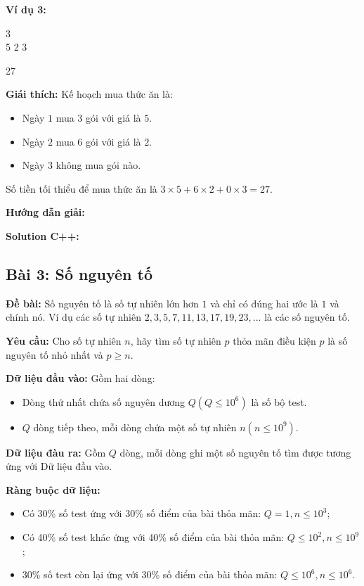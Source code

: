 \documentclass[12pt]{scrartcl}  %
\begin{document}
\textbf{Ví dụ 3:}
\begin{tcolorbox}[colback=gray!5!white, colframe=blue!50!black, title=Input]
3\\
5 2 3
\end{tcolorbox}
\begin{tcolorbox}[colback=gray!5!white, colframe=green!50!black, title=Output]
27
\end{tcolorbox}

\textbf{Giái thích:}
Kế hoạch mua thức ăn là:
\begin{itemize}
    \item Ngày $1$ mua $3$ gói với giá là $5$.
    \item Ngày $2$ mua $6$ gói với giá là $2$.
    \item Ngày $3$ không mua gói nào.
\end{itemize}
Số tiền tối thiểu để mua thức ăn là $3 \times 5 + 6 \times 2 + 0 \times 3 = 27$.

\textbf{Hướng dẫn giải:}

\textbf{Solution C++:}

\subsection{Bài 3: Số nguyên tố}
\textbf{Đề bài:}
Số nguyên tố là số tự nhiên lớn hơn $1$ và chỉ có đúng hai ước là $1$ và chính nó. Ví dụ các số tự nhiên $2, 3, 5, 7, 11, 13, 17, 19, 23, ...$ là các số nguyên tố.

\textbf{Yêu cầu:}
Cho số tự nhiên $n$, hãy tìm số tự nhiên $p$ thỏa mãn điều kiện $p$ là số nguyên tố nhỏ nhất và $p \geq n$.

\textbf{Dữ liệu đầu vào:}
Gồm hai dòng:
\begin{itemize}
    \item Dòng thứ nhất chứa số nguyên dương $Q (Q \leq 10^6)$ là số bộ test. 
    \item $Q$ dòng tiếp theo, mỗi dòng chứa một số tự nhiên $n (n \leq 10^9)$.
\end{itemize}

\textbf{Dữ liệu đàu ra:}
Gồm $Q$ dòng, mỗi dòng ghi một số nguyên tố tìm được tương ứng với Dữ liệu đầu vào.

\textbf{Ràng buộc dữ liệu:}
\begin{itemize}
    \item Có 30\% số test ứng với 30\% số điểm của bài thỏa mãn: $Q = 1, n \leq 10^3$;
    \item Có 40\% số test khác ứng với 40\% số điểm của bài thỏa mãn: $Q \leq 10^2, n \leq 10^9$;
    \item 30\% số test còn lại ứng với 30\% số điểm của bài thỏa mãn: $Q \leq 10^6, n \leq 10^6$.
\end{itemize}
\end{document}
